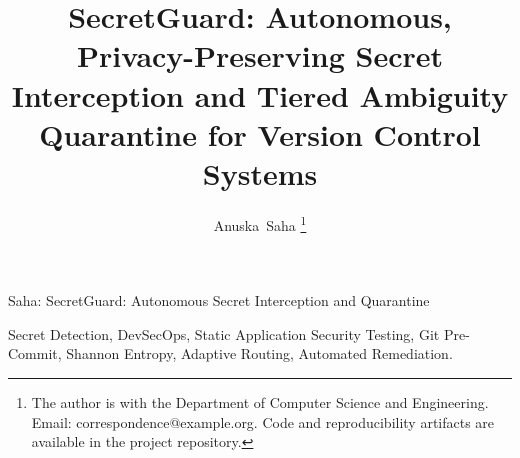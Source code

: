 \documentclass[10pt,journal,compsoc]{IEEEtran}
\begin{document}
\title{SecretGuard: Autonomous, Privacy-Preserving Secret Interception and Tiered Ambiguity Quarantine for Version Control Systems}

\author{Anuska~Saha%
\thanks{The author is with the Department of Computer Science and Engineering. Email: correspondence@example.org. Code and reproducibility artifacts are available in the project repository.}%
}

%
{Saha: SecretGuard: Autonomous Secret Interception and Quarantine}

\maketitle



\begin{IEEEkeywords}
Secret Detection, DevSecOps, Static Application Security Testing, Git Pre-Commit, Shannon Entropy, Adaptive Routing, Automated Remediation.
\end{IEEEkeywords}












\end{document}
